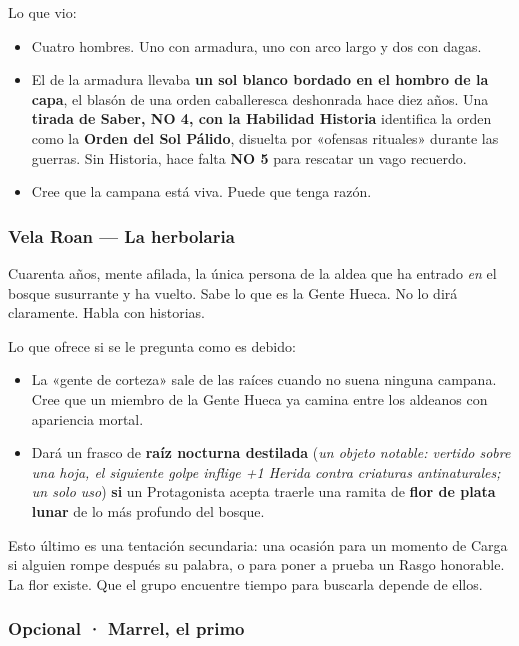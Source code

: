 \documentclass[10pt,a4paper]{article}
\newcommand{\tightlist}{\setlength{\itemsep}{0pt}\setlength{\parskip}{0pt}}
\begin{document}
Lo que vio:

\begin{itemize}
\tightlist
\item
  Cuatro hombres. Uno con armadura, uno con arco largo y dos con dagas.
\item
  El de la armadura llevaba \textbf{un sol blanco bordado en el hombro de la capa}, el blasón de una orden caballeresca deshonrada hace diez años. Una \textbf{tirada de Saber, NO 4, con la Habilidad Historia} identifica la orden como la \textbf{Orden del Sol Pálido}, disuelta por «ofensas rituales» durante las guerras. Sin Historia, hace falta \textbf{NO 5} para rescatar un vago recuerdo.
\item
  Cree que la campana está viva. Puede que tenga razón.
\end{itemize}

\subsubsection{Vela Roan --- La herbolaria}\label{vela-roan-la-herbolaria}

Cuarenta años, mente afilada, la única persona de la aldea que ha entrado \emph{en} el bosque susurrante y ha vuelto. Sabe lo que es la Gente Hueca. No lo dirá claramente. Habla con historias.

Lo que ofrece si se le pregunta como es debido:

\begin{itemize}
\tightlist
\item
  La «gente de corteza» sale de las raíces cuando no suena ninguna campana. Cree que un miembro de la Gente Hueca ya camina entre los aldeanos con apariencia mortal.
\item
  Dará un frasco de \textbf{raíz nocturna destilada} (\emph{un objeto notable: vertido sobre una hoja, el siguiente golpe inflige +1 Herida contra criaturas antinaturales; un solo uso}) \textbf{si} un Protagonista acepta traerle una ramita de \textbf{flor de plata lunar} de lo más profundo del bosque.
\end{itemize}

Esto último es una tentación secundaria: una ocasión para un momento de Carga si alguien rompe después su palabra, o para poner a prueba un Rasgo honorable. La flor existe. Que el grupo encuentre tiempo para buscarla depende de ellos.

\subsubsection{Opcional · Marrel, el primo}\label{opcional-marrel-el-primo}
\end{document}
